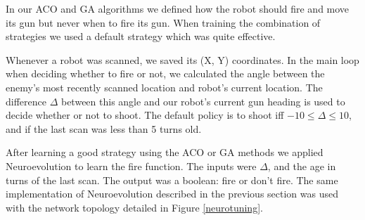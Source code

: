 In our ACO and GA algorithms we defined how the robot should fire and move its gun but never when to fire its gun. When training the combination of strategies we used a default strategy which was quite effective.

Whenever a robot was scanned, we saved its (X, Y) coordinates. In the main loop when deciding whether to fire or not, we calculated the angle between the enemy's most recently scanned location and robot's current location. The difference $\Delta$ between this angle and our robot's current gun heading is used to decide whether or not to shoot. The default policy is to shoot iff $-10 \leq \Delta \leq 10$, and if the last scan was less than 5 turns old.

After learning a good strategy using the ACO or GA methods we applied Neuroevolution to learn the fire function. The inputs were $\Delta$, and the age in turns of the last scan. The output was a boolean: fire or don't fire. The same implementation of Neuroevolution described in the previous section was used with the network topology detailed in Figure \ref{neurotuning}.

\FigNeurotuning
